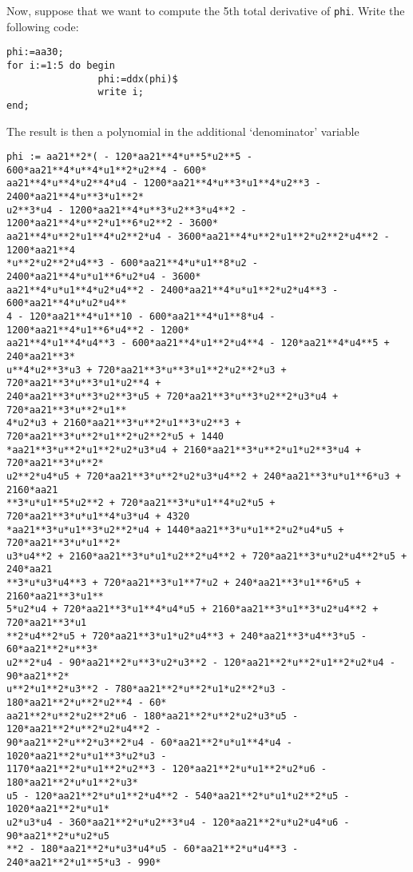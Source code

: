 Now, suppose that we want to compute the 5th total derivative of
\texttt{phi}. Write the following code:
\begin{verbatim}
phi:=aa30;
for i:=1:5 do begin
                phi:=ddx(phi)$
                write i;
end;
\end{verbatim}
The result is then a polynomial in the additional `denominator' variable
\begin{verbatim}
phi := aa21**2*( - 120*aa21**4*u**5*u2**5 - 600*aa21**4*u**4*u1**2*u2**4 - 600*
aa21**4*u**4*u2**4*u4 - 1200*aa21**4*u**3*u1**4*u2**3 - 2400*aa21**4*u**3*u1**2*
u2**3*u4 - 1200*aa21**4*u**3*u2**3*u4**2 - 1200*aa21**4*u**2*u1**6*u2**2 - 3600*
aa21**4*u**2*u1**4*u2**2*u4 - 3600*aa21**4*u**2*u1**2*u2**2*u4**2 - 1200*aa21**4
*u**2*u2**2*u4**3 - 600*aa21**4*u*u1**8*u2 - 2400*aa21**4*u*u1**6*u2*u4 - 3600*
aa21**4*u*u1**4*u2*u4**2 - 2400*aa21**4*u*u1**2*u2*u4**3 - 600*aa21**4*u*u2*u4**
4 - 120*aa21**4*u1**10 - 600*aa21**4*u1**8*u4 - 1200*aa21**4*u1**6*u4**2 - 1200*
aa21**4*u1**4*u4**3 - 600*aa21**4*u1**2*u4**4 - 120*aa21**4*u4**5 + 240*aa21**3*
u**4*u2**3*u3 + 720*aa21**3*u**3*u1**2*u2**2*u3 + 720*aa21**3*u**3*u1*u2**4 + 
240*aa21**3*u**3*u2**3*u5 + 720*aa21**3*u**3*u2**2*u3*u4 + 720*aa21**3*u**2*u1**
4*u2*u3 + 2160*aa21**3*u**2*u1**3*u2**3 + 720*aa21**3*u**2*u1**2*u2**2*u5 + 1440
*aa21**3*u**2*u1**2*u2*u3*u4 + 2160*aa21**3*u**2*u1*u2**3*u4 + 720*aa21**3*u**2*
u2**2*u4*u5 + 720*aa21**3*u**2*u2*u3*u4**2 + 240*aa21**3*u*u1**6*u3 + 2160*aa21
**3*u*u1**5*u2**2 + 720*aa21**3*u*u1**4*u2*u5 + 720*aa21**3*u*u1**4*u3*u4 + 4320
*aa21**3*u*u1**3*u2**2*u4 + 1440*aa21**3*u*u1**2*u2*u4*u5 + 720*aa21**3*u*u1**2*
u3*u4**2 + 2160*aa21**3*u*u1*u2**2*u4**2 + 720*aa21**3*u*u2*u4**2*u5 + 240*aa21
**3*u*u3*u4**3 + 720*aa21**3*u1**7*u2 + 240*aa21**3*u1**6*u5 + 2160*aa21**3*u1**
5*u2*u4 + 720*aa21**3*u1**4*u4*u5 + 2160*aa21**3*u1**3*u2*u4**2 + 720*aa21**3*u1
**2*u4**2*u5 + 720*aa21**3*u1*u2*u4**3 + 240*aa21**3*u4**3*u5 - 60*aa21**2*u**3*
u2**2*u4 - 90*aa21**2*u**3*u2*u3**2 - 120*aa21**2*u**2*u1**2*u2*u4 - 90*aa21**2*
u**2*u1**2*u3**2 - 780*aa21**2*u**2*u1*u2**2*u3 - 180*aa21**2*u**2*u2**4 - 60*
aa21**2*u**2*u2**2*u6 - 180*aa21**2*u**2*u2*u3*u5 - 120*aa21**2*u**2*u2*u4**2 - 
90*aa21**2*u**2*u3**2*u4 - 60*aa21**2*u*u1**4*u4 - 1020*aa21**2*u*u1**3*u2*u3 - 
1170*aa21**2*u*u1**2*u2**3 - 120*aa21**2*u*u1**2*u2*u6 - 180*aa21**2*u*u1**2*u3*
u5 - 120*aa21**2*u*u1**2*u4**2 - 540*aa21**2*u*u1*u2**2*u5 - 1020*aa21**2*u*u1*
u2*u3*u4 - 360*aa21**2*u*u2**3*u4 - 120*aa21**2*u*u2*u4*u6 - 90*aa21**2*u*u2*u5
**2 - 180*aa21**2*u*u3*u4*u5 - 60*aa21**2*u*u4**3 - 240*aa21**2*u1**5*u3 - 990*

\end{verbatim}

